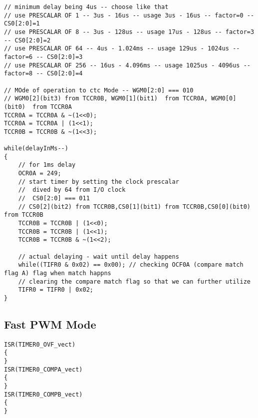 \begin{verbatim}
// minimum delay being 4us -- choose like that
// use PRESCALAR OF 1 -- 3us - 16us -- usage 3us - 16us -- factor=0 -- CS0[2:0]=1
// use PRESCALAR OF 8 -- 3us - 128us -- usage 17us - 128us -- factor=3 -- CS0[2:0]=2
// use PRESCALAR OF 64 -- 4us - 1.024ms -- usage 129us - 1024us -- factor=6 -- CS0[2:0]=3
// use PRESCALAR OF 256 -- 16us - 4.096ms -- usage 1025us - 4096us -- factor=8 -- CS0[2:0]=4
    
// MOde of operation to ctc Mode -- WGM0[2:0] === 010
// WGM0[2](bit3) from TCCR0B, WGM0[1](bit1)  from TCCR0A, WGM0[0](bit0)  from TCCR0A
TCCR0A = TCCR0A & ~(1<<0);
TCCR0A = TCCR0A | (1<<1);
TCCR0B = TCCR0B & ~(1<<3);

while(delayInMs--)
{
    // for 1ms delay
    OCR0A = 249;
    // start timer by setting the clock prescalar
    //  dived by 64 from I/O clock
    //  CS0[2:0] === 011
    // CS0[2](bit2) from TCCR0B,CS0[1](bit1) from TCCR0B,CS0[0](bit0) from TCCR0B
    TCCR0B = TCCR0B | (1<<0);
    TCCR0B = TCCR0B | (1<<1);
    TCCR0B = TCCR0B & ~(1<<2);

    // actual delaying - wait until delay happens
    while((TIFR0 & 0x02) == 0x00); // checking OCF0A (compare match flag A) flag when match happns
    // clearing the compare match flag so that we can further utilize
    TIFR0 = TIFR0 | 0x02;
}
\end{verbatim}

\subsection{Fast PWM Mode}
\begin{verbatim}
ISR(TIMER0_OVF_vect)
{
} 
ISR(TIMER0_COMPA_vect)
{
}
ISR(TIMER0_COMPB_vect)
{
}
\end{verbatim}
